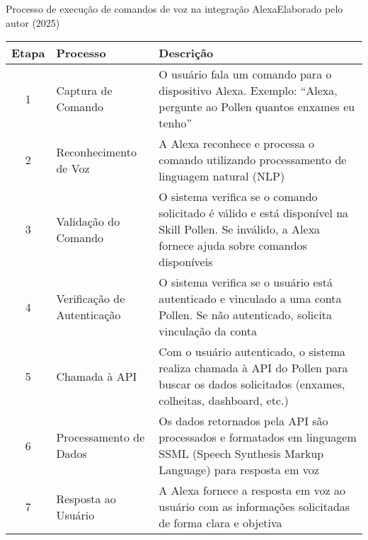 \begin{quadro}{Processo de execução de comandos de voz na integração Alexa}{Elaborado pelo autor (2025)}
\label{quad:fluxo-comandos-voz}
\renewcommand{\arraystretch}{1.5}
\small
\begin{tabular}{|c|p{4cm}|p{8cm}|}
\hline
\textbf{Etapa} & \textbf{Processo} & \textbf{Descrição} \\ \hline

1 & Captura de Comando & O usuário fala um comando para o dispositivo Alexa. Exemplo: \textquotedblleft Alexa, pergunte ao Pollen quantos enxames eu tenho\textquotedblright \\ \hline

2 & Reconhecimento de Voz & A Alexa reconhece e processa o comando utilizando processamento de linguagem natural (NLP) \\ \hline

3 & Validação do Comando & O sistema verifica se o comando solicitado é válido e está disponível na Skill Pollen. Se inválido, a Alexa fornece ajuda sobre comandos disponíveis \\ \hline

4 & Verificação de Autenticação & O sistema verifica se o usuário está autenticado e vinculado a uma conta Pollen. Se não autenticado, solicita vinculação da conta \\ \hline

5 & Chamada à API & Com o usuário autenticado, o sistema realiza chamada à API do Pollen para buscar os dados solicitados (enxames, colheitas, dashboard, etc.) \\ \hline

6 & Processamento de Dados & Os dados retornados pela API são processados e formatados em linguagem SSML (Speech Synthesis Markup Language) para resposta em voz \\ \hline

7 & Resposta ao Usuário & A Alexa fornece a resposta em voz ao usuário com as informações solicitadas de forma clara e objetiva \\ \hline

\end{tabular}
\end{quadro}